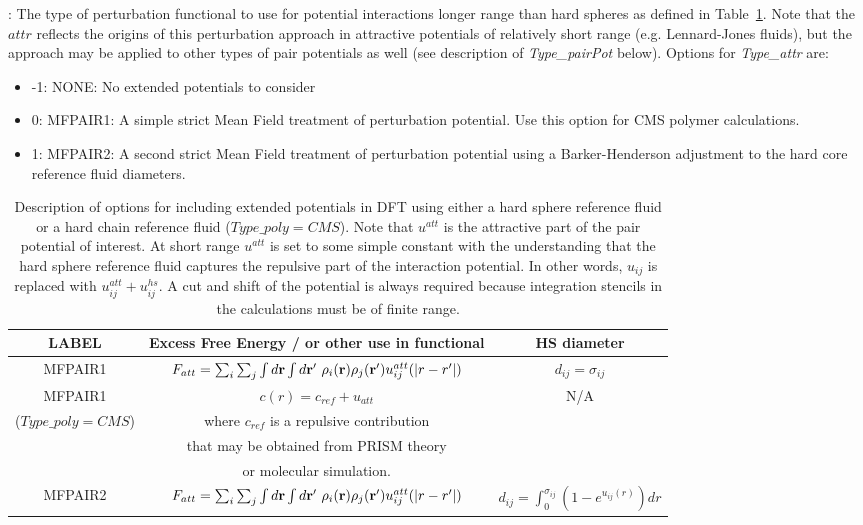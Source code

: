 \documentclass[10pt,onecolumn]{article}
\begin{document}
\noindent\dotfill

\vspace{0.1in}
: The type of perturbation functional to use for potential interactions
longer range than hard spheres as defined in Table~\ref{tab:funcatt}.  Note that the $attr$ reflects the origins of this perturbation approach
in attractive potentials of relatively short range (e.g. Lennard-Jones fluids), but the approach may be applied to other types of pair potentials as well (see description of {\it Type\_pairPot} below).  Options for {\it Type\_attr} are:
\begin{itemize}
\item{-1: NONE: No extended potentials to consider}
\item{0: MFPAIR1: A simple strict Mean Field treatment of perturbation potential.  Use this option for CMS polymer calculations.}
\item{1: MFPAIR2: A second strict Mean Field treatment of perturbation potential using a Barker-Henderson adjustment to the hard core reference fluid diameters.}
\end{itemize}

\begin{table}[h]
\center\begin{tabular}{|c|c|c|} \hline
LABEL & Excess Free Energy / or other use in functional & HS diameter \\ \hline
MFPAIR1 &  $F_{att} =  \sum_i\sum_j\int {d{\bf r}} \int {d{\bf r'}}\ \rho_i({\bf r})\rho_j
({\bf r'})u_{ij}^{att}(|r-r'|)$ & $d_{ij}=\sigma_{ij}$ \\ \hline
MFPAIR1  & $c(r) =  c_{ref}+u_{att}$ & N/A \\ 
($Type\_poly=CMS$) & where $c_{ref}$ is a repulsive contribution & \\
& that may be obtained from PRISM theory & \\
& or molecular simulation. & \\ \hline
MFPAIR2& $F_{att} =  \sum_i\sum_j\int {d{\bf r}} \int {d{\bf r'}}\ \rho_i({\bf r})\rho_j({\bf r'})u_{ij}^{att}(|r-r'|)$& $d_{ij}=\int_0^{\sigma_{ij}} (1-e^{u_{ij}(r)})dr$  \\ \hline
\end{tabular}
\caption{Description of options for including extended potentials in DFT using either a hard sphere
reference fluid or a hard chain reference fluid ($Type\_poly=CMS$).  Note that $u^{att}$ is the attractive part of the pair potential of interest.  At short range $u^{att}$ is set to some simple constant with the understanding that the hard sphere reference fluid captures the repulsive part of the interaction potential. In other words, $u_{ij}$ is 
replaced with $u_{ij}^{att}+u_{ij}^{hs}$.  A cut and shift of the potential is always required because integration stencils in the calculations must be of finite range.  
}
\label{tab:funcatt}
\end{table}
\end{document}
